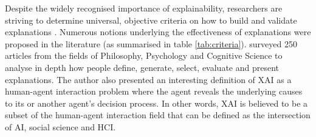 \documentclass[final,1p,times]{elsarticle}
\begin{document}
Despite the widely recognised importance of explainability, researchers are striving to determine universal, objective criteria on how to build and validate explanations \cite{miller2017explanation}. Numerous notions underlying the effectiveness of explanations were proposed in the literature (as summarised in table \ref{tab:criteria}). \cite{miller2017explanation} surveyed 250 articles from the fields of Philosophy, Psychology and Cognitive Science to analyse in depth how people define, generate, select, evaluate and present explanations. The author also presented an interesting definition of XAI as a human-agent interaction problem where the agent reveals the underlying causes to its or another agent's decision process. In other words, XAI is believed to be a subset of the human-agent interaction field that can be defined as the intersection of AI, social science and HCI.\\
\end{document}
